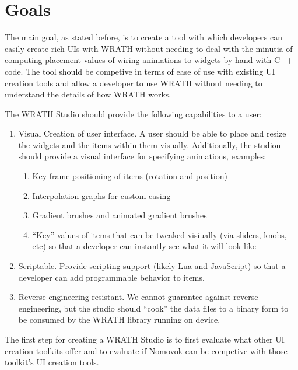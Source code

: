 \documentclass[a4paper,11pt]{article}
\begin{document}
\section{Goals}
\begin{indenter}{2cm}
 
The main goal, as stated before, is to create a tool with which developers can easily create rich UIs with WRATH without needing to deal with the minutia of computing placement values of wiring animations to widgets by hand with C++ code. The tool should be competive in terms of ease of use with existing UI creation tools and allow a developer to use WRATH without needing to understand the details of how WRATH works. 

The WRATH Studio should provide the following capabilities to a user:
\begin{enumerate}
\item Visual Creation of user interface. A user should be able to place and resize the widgets and the items within them visually. Additionally, the studion should provide a visual interface for specifying animations, examples:
\begin{enumerate}
\item Key frame positioning of items (rotation and position)
\item Interpolation graphs for custom easing
\item Gradient brushes and animated gradient brushes
\item ``Key'' values of items that can be tweaked visiually (via sliders, knobs, etc) so that a developer can instantly see what it will look like 
\end{enumerate}
\item Scriptable. Provide scripting support (likely Lua and JavaScript) so that a developer can add programmable behavior to items.
\item Reverse engineering resistant. We cannot guarantee against reverse engineering, but the studio should ``cook'' the data files to a binary form to be consumed by the WRATH library running on device. 
\end{enumerate}

The first step for creating a WRATH Studio is to first evaluate what other UI creation toolkits offer and to evaluate if Nomovok can be competive with those toolkit's UI creation tools.

\end{indenter}
\end{document}
